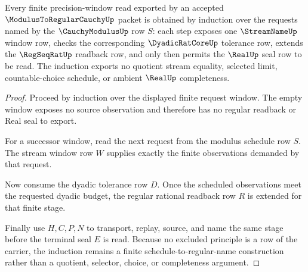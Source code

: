 \begin{theorem}
\label{thm:modulus-to-regular-cauchy-window-induction}
Every finite precision-window read exported by an accepted $\ModulusToRegularCauchyUp$ packet is obtained by induction over the requests named by the $\CauchyModulusUp$ row $S$: each step exposes one $\StreamNameUp$ window row, checks the corresponding $\DyadicRatCoreUp$ tolerance row, extends the $\RegSeqRatUp$ readback row, and only then permits the $\RealUp$ seal row to be read. The induction exports no quotient stream equality, selected limit, countable-choice schedule, or ambient $\RealUp$ completeness.
\end{theorem}
\begin{proof}
Proceed by induction over the displayed finite request window. The empty window exposes no source observation and therefore has no regular readback or Real seal to export.

For a successor window, read the next request from the modulus schedule row $S$. The stream window row $W$ supplies exactly the finite observations demanded by that request.

Now consume the dyadic tolerance row $D$. Once the scheduled observations meet the requested dyadic budget, the regular rational readback row $R$ is extended for that finite stage.

Finally use $H,C,P,N$ to transport, replay, source, and name the same stage before the terminal seal $E$ is read. Because no excluded principle is a row of the carrier, the induction remains a finite schedule-to-regular-name construction rather than a quotient, selector, choice, or completeness argument.
\end{proof}



